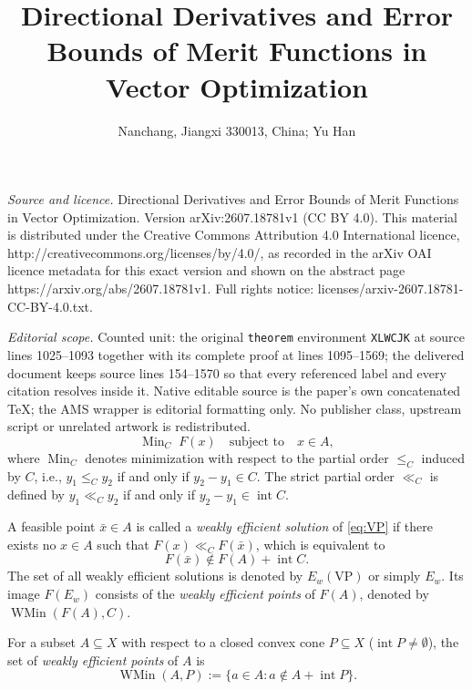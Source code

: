 \documentclass[10pt,a4paper]{amsart}
\DeclareMathOperator{\intr}{int}
\begin{document}
\title[Directional Derivatives and Error Bounds of Merit Functions ]{Directional Derivatives and Error Bounds of Merit Functions in Vector Optimization}
\author{Nanchang, Jiangxi 330013, China; Yu Han}
\date{}
\maketitle
\noindent\emph{Source and licence.} Directional Derivatives and Error Bounds of Merit Functions in Vector Optimization. Version arXiv:2607.18781v1 (CC BY 4.0). This material is distributed under the Creative Commons Attribution 4.0 International licence, http://creativecommons.org/licenses/by/4.0/, as recorded in the arXiv OAI licence metadata for this exact version and shown on the abstract page https://arxiv.org/abs/2607.18781v1. Full rights notice: licenses/arxiv-2607.18781-CC-BY-4.0.txt.\par\smallskip
\noindent\textit{Editorial scope.} Counted unit: the original \texttt{theorem} environment \texttt{XLWCJK} at source lines 1025--1093 together with its complete proof at lines 1095--1569; the delivered document keeps source lines 154--1570 so that every referenced label and every citation resolves inside it. Native editable source is the paper's own concatenated TeX; the AMS wrapper is editorial formatting only. No publisher class, upstream script or unrelated artwork is redistributed.
\begin{equation}\label{eq:VP}
	\operatorname{Min}_C \; F(x) \quad \text{subject to} \quad x \in A,
\end{equation}
where $\operatorname{Min}_C$ denotes minimization with respect to the partial order $\leq_C$ induced by $C$, i.e., $y_1 \leq_C y_2$ if and only if $y_2 - y_1 \in C$. The strict partial order $\ll_C$ is defined by $y_1 \ll_C y_2$ if and only if $y_2 - y_1 \in \intr C$.

A feasible point $\bar{x} \in A$ is called a \emph{weakly efficient solution} of \eqref{eq:VP} if there exists no $x \in A$ such that $F(x) \ll_C F(\bar{x})$, which is equivalent to
\[
F(\bar{x}) \notin F(A) + \intr C.
\]
The set of all weakly efficient solutions is denoted by $E_w(\text{VP})$ or simply $E_w$. Its image $F(E_w)$ consists of the \emph{weakly efficient points} of $F(A)$, denoted by $\operatorname{WMin}(F(A), C)$.  


For a subset $A \subseteq X$ with respect to a closed convex cone $P \subseteq X$ ($\intr P \neq \emptyset$), the set of \emph{weakly efficient points} of $A$ is
\[
\operatorname{WMin}(A, P) := \{a \in A : a \notin A + \intr P\}.
\]
\end{document}
